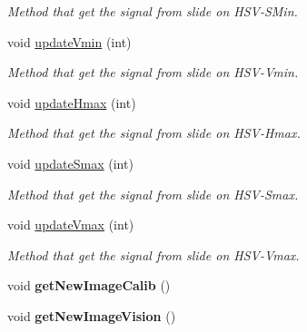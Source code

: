 \begin{DoxyCompactItemize}
\begin{DoxyCompactList}\small\item\em Method that get the signal from slide on H\-S\-V-\/\-S\-Min. \end{DoxyCompactList}\item 
\hypertarget{classMainWindow_a43da847294670cdaaa17f2235888b47a}{void \hyperlink{classMainWindow_a43da847294670cdaaa17f2235888b47a}{update\-Vmin} (int)}\label{classMainWindow_a43da847294670cdaaa17f2235888b47a}

\begin{DoxyCompactList}\small\item\em Method that get the signal from slide on H\-S\-V-\/\-Vmin. \end{DoxyCompactList}\item 
\hypertarget{classMainWindow_af3d7639f0c28d053fdc10484b109ac99}{void \hyperlink{classMainWindow_af3d7639f0c28d053fdc10484b109ac99}{update\-Hmax} (int)}\label{classMainWindow_af3d7639f0c28d053fdc10484b109ac99}

\begin{DoxyCompactList}\small\item\em Method that get the signal from slide on H\-S\-V-\/\-Hmax. \end{DoxyCompactList}\item 
\hypertarget{classMainWindow_a2c08d2f7c55d78c30b12dd3a16905d7b}{void \hyperlink{classMainWindow_a2c08d2f7c55d78c30b12dd3a16905d7b}{update\-Smax} (int)}\label{classMainWindow_a2c08d2f7c55d78c30b12dd3a16905d7b}

\begin{DoxyCompactList}\small\item\em Method that get the signal from slide on H\-S\-V-\/\-Smax. \end{DoxyCompactList}\item 
\hypertarget{classMainWindow_a2f06abb52f3906ae6177f7fc9f859505}{void \hyperlink{classMainWindow_a2f06abb52f3906ae6177f7fc9f859505}{update\-Vmax} (int)}\label{classMainWindow_a2f06abb52f3906ae6177f7fc9f859505}

\begin{DoxyCompactList}\small\item\em Method that get the signal from slide on H\-S\-V-\/\-Vmax. \end{DoxyCompactList}\item 
\hypertarget{classMainWindow_a05ab58ddf53a08fd87eaa649a613a7de}{void {\bfseries get\-New\-Image\-Calib} ()}\label{classMainWindow_a05ab58ddf53a08fd87eaa649a613a7de}

\item 
\hypertarget{classMainWindow_abb46a3a6a45022dc2fc96b17874b1190}{void {\bfseries get\-New\-Image\-Vision} ()}\label{classMainWindow_abb46a3a6a45022dc2fc96b17874b1190}

\end{DoxyCompactItemize}
